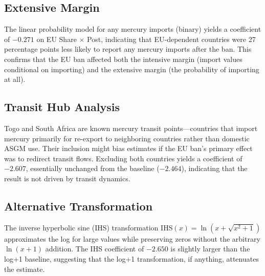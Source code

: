 \documentclass[12pt]{article}
\begin{document}
\subsection{Extensive Margin}

The linear probability model for any mercury imports (binary) yields a coefficient of $-0.271$ on EU Share $\times$ Post, indicating that EU-dependent countries were 27 percentage points less likely to report any mercury imports after the ban. This confirms that the EU ban affected both the intensive margin (import values conditional on importing) and the extensive margin (the probability of importing at all).

\subsection{Transit Hub Analysis}

Togo and South Africa are known mercury transit points---countries that import mercury primarily for re-export to neighboring countries rather than domestic ASGM use. Their inclusion might bias estimates if the EU ban's primary effect was to redirect transit flows. Excluding both countries yields a coefficient of $-2.607$, essentially unchanged from the baseline ($-2.464$), indicating that the result is not driven by transit dynamics.

\subsection{Alternative Transformation}

The inverse hyperbolic sine (IHS) transformation $\text{IHS}(x) = \ln(x + \sqrt{x^2 + 1})$ approximates the log for large values while preserving zeros without the arbitrary $\ln(x+1)$ addition. The IHS coefficient of $-2.650$ is slightly larger than the log+1 baseline, suggesting that the log+1 transformation, if anything, attenuates the estimate.
\end{document}

